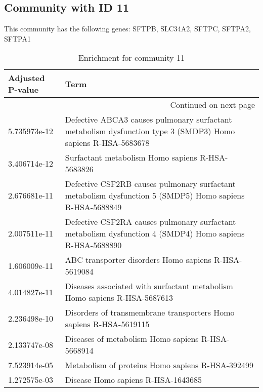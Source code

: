 \subsection*{Community with ID 11}
This community has the following genes: SFTPB, SLC34A2, SFTPC, SFTPA2, SFTPA1
\\
\begin{longtable}{p{2.4cm}p{14.5cm}}
\caption{Enrichment for community 11}\\
\toprule
Adjusted \newline P-value &                                                                                                          Term \\
\midrule
\endhead
\midrule
\multicolumn{2}{r}{{Continued on next page}} \\
\midrule
\endfoot

\bottomrule
\endlastfoot
             5.735973e-12 &  Defective ABCA3 causes pulmonary surfactant metabolism dysfunction type 3 (SMDP3) Homo sapiens R-HSA-5683678 \\
             3.406714e-12 &                                                              Surfactant metabolism Homo sapiens R-HSA-5683826 \\
             2.676681e-11 &      Defective CSF2RB causes pulmonary surfactant metabolism dysfunction 5 (SMDP5) Homo sapiens R-HSA-5688849 \\
             2.007511e-11 &      Defective CSF2RA causes pulmonary surfactant metabolism dysfunction 4 (SMDP4) Homo sapiens R-HSA-5688890 \\
             1.606009e-11 &                                                          ABC transporter disorders Homo sapiens R-HSA-5619084 \\
             4.014827e-11 &                                     Diseases associated with surfactant metabolism Homo sapiens R-HSA-5687613 \\
             2.236498e-10 &                                            Disorders of transmembrane transporters Homo sapiens R-HSA-5619115 \\
             2.133747e-08 &                                                             Diseases of metabolism Homo sapiens R-HSA-5668914 \\
             7.523914e-05 &                                                              Metabolism of proteins Homo sapiens R-HSA-392499 \\
             1.272575e-03 &                                                                            Disease Homo sapiens R-HSA-1643685 \\
\end{longtable}


